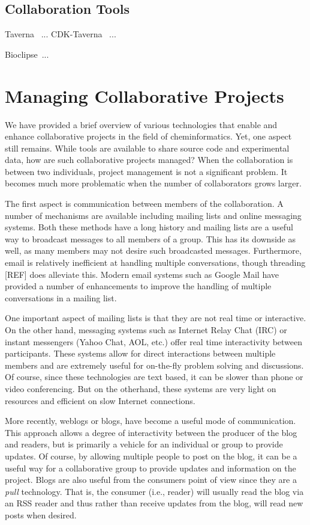 \documentclass[12pt]{book}
\begin{document}
\subsection{Collaboration Tools}

Taverna~\cite{Oinn2004} ... CDK-Taverna~\cite{Kuhn2010} ...

Bioclipse~\cite{Spjuth2009,Spjuth2007}...

\section{Managing Collaborative Projects}

We have provided a brief overview of various technologies that enable
and enhance collaborative projects in the field of
cheminformatics. Yet, one aspect still remains. While tools are
available to share source code and experimental data, how are such
collaborative projects managed? When the collaboration is between two
individuals, project management is not a significant problem. It
becomes much more problematic when the number of collaborators grows
larger.

The first aspect is communication between members of the
collaboration. A number of mechanisms are available including mailing
lists and online messaging systems. Both these methods have a long
history and mailing lists are a useful way to broadcast messages to
all members of a group. This has its downside as well, as many members
may not desire such broadcasted messages. Furthermore, email is
relatively inefficient at handling multiple conversations, though
threading [REF] does alleviate this. Modern email systems such as
Google Mail have provided a number of enhancements to improve the
handling of multiple conversations in a mailing list. 

One important aspect of mailing lists is that they are not real time
or interactive. On the other hand, messaging systems such as Internet
Relay Chat (IRC) or instant messengers (Yahoo Chat, AOL, etc.) offer
real time interactivity between participants. These systems allow for
direct interactions between multiple members and are extremely useful
for on-the-fly problem solving and discussions. Of course, since these
technologies are text based, it can be slower than phone or video
conferencing. But on the otherhand, these systems are very light on
resources and efficient on slow Internet connections.

More recently, weblogs or blogs, have become a useful mode of
communication. This approach allows a degree of interactivity between
the producer of the blog and readers, but is primarily a vehicle for
an individual or group to provide updates. Of course, by allowing
multiple people to post on the blog, it can be a useful way for a
collaborative group to provide updates and information on the
project. Blogs are also useful from the consumers point of view since
they are a \emph{pull} technology. That is, the consumer (i.e.,
reader) will usually read the blog via an RSS reader and thus rather
than receive updates from the blog, will read new posts when desired.
\end{document}
